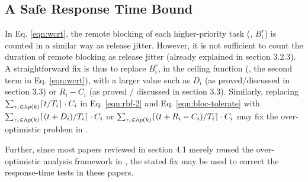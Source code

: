 \subsection{A Safe Response Time Bound}
\label{sec:safe_bound}

In Eq. \ref{eqn:wcrt}, the remote blocking of each higher-priority task (\ie, $B_i^r$) is counted in a similar way as release jitter. However, it is not sufficient to count the duration of remote blocking as release jitter (already explained in section 3.2.3). A straightforward fix is thus to replace $B_i^r$, in the ceiling function (\ie, the second term in Eq. \ref{eqn:wcrt}), with a larger value such as $D_i$ (as proved/discussed in section 3.3) or $R_i - C_i$ (as proved / discussed in section 3.3). Similarly, replacing $\sum_{\tau_i \in \mathit{hp}(k)} \lceil t / T_i \rceil \cdot C_i$ in Eq. \ref{eqn:rbf-2} and Eq. \ref{eqn:bloc-tolerate} with $\sum_{\tau_i \in \mathit{hp}(k)} \lceil (t+D_i) / T_i \rceil \cdot C_i$ or $\sum_{\tau_i \in \mathit{hp}(k)} \lceil (t+R_i-C_i) / T_i \rceil \cdot C_i$ may fix the over-optimistic problem in \cite{NBN:11}.

Further, since most papers reviewed in section 4.1 merely reused the over-optimistic analysis framework in \cite{lakshmanan-2009}, the stated fix may be used to correct the response-time tests in these papers.